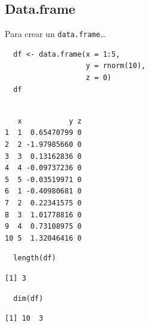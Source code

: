 \documentclass[aspectratio=169, usenames,svgnames,dvipsnames]{beamer}
\begin{document}
\subsection{Data.frame}
\label{sec:org3f7e65b}
\begin{frame}[label={sec:org11b2b70},fragile]{Para crear un \texttt{data.frame}\ldots{}}
 \lstset{language=r,label= ,caption= ,captionpos=b,numbers=none}
\begin{lstlisting}
  df <- data.frame(x = 1:5,
                   y = rnorm(10),
                   z = 0)
  df
\end{lstlisting}

\begin{verbatim}

   x           y z
1  1  0.65470799 0
2  2 -1.97985660 0
3  3  0.13162836 0
4  4 -0.09737236 0
5  5 -0.03519971 0
6  1 -0.40980681 0
7  2  0.22341575 0
8  3  1.01778816 0
9  4  0.73108975 0
10 5  1.32046416 0
\end{verbatim}

\lstset{language=r,label= ,caption= ,captionpos=b,numbers=none}
\begin{lstlisting}
  length(df)
\end{lstlisting}

\begin{verbatim}
[1] 3
\end{verbatim}


\lstset{language=r,label= ,caption= ,captionpos=b,numbers=none}
\begin{lstlisting}
  dim(df)
\end{lstlisting}

\begin{verbatim}
[1] 10  3
\end{verbatim}
\end{frame}
\end{document}
